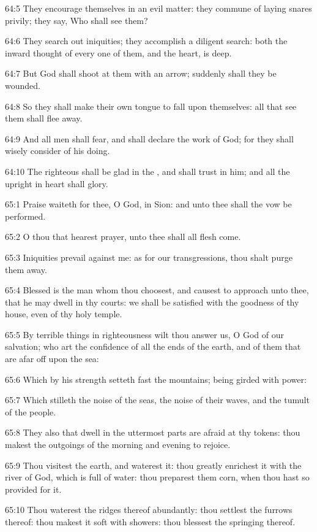 64:5 They encourage themselves in an evil matter: they commune of laying snares privily; they say, Who shall see them?

64:6 They search out iniquities; they accomplish a diligent search: both the inward thought of every one of them, and the heart, is deep.

64:7 But God shall shoot at them with an arrow; suddenly shall they be wounded.

64:8 So they shall make their own tongue to fall upon themselves: all that see them shall flee away.

64:9 And all men shall fear, and shall declare the work of God; for they shall wisely consider of his doing.

64:10 The righteous shall be glad in the \LORD, and shall trust in him; and all the upright in heart shall glory.



65:1 Praise waiteth for thee, O God, in Sion: and unto thee shall the vow be performed.

65:2 O thou that hearest prayer, unto thee shall all flesh come.

65:3 Iniquities prevail against me: as for our transgressions, thou shalt purge them away.

65:4 Blessed is the man whom thou choosest, and causest to approach unto thee, that he may dwell in thy courts: we shall be satisfied with the goodness of thy house, even of thy holy temple.

65:5 By terrible things in righteousness wilt thou answer us, O God of our salvation; who art the confidence of all the ends of the earth, and of them that are afar off upon the sea:

65:6 Which by his strength setteth fast the mountains; being girded with power:

65:7 Which stilleth the noise of the seas, the noise of their waves, and the tumult of the people.

65:8 They also that dwell in the uttermost parts are afraid at thy tokens: thou makest the outgoings of the morning and evening to rejoice.

65:9 Thou visitest the earth, and waterest it: thou greatly enrichest it with the river of God, which is full of water: thou preparest them corn, when thou hast so provided for it.

65:10 Thou waterest the ridges thereof abundantly: thou settlest the furrows thereof: thou makest it soft with showers: thou blessest the springing thereof.

